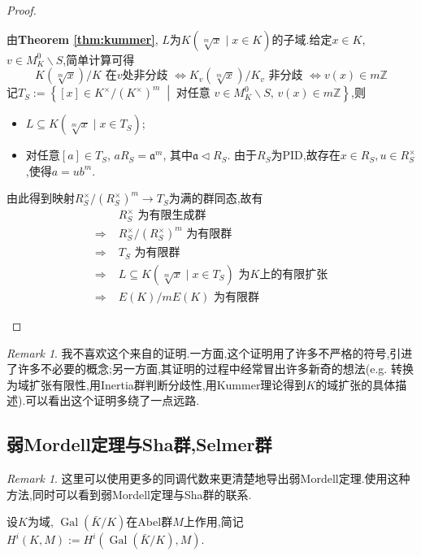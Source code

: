 \documentclass[12pt,A4paper,oneside,reqno]{amsart}
\numberwithin{equation}{section}
\theoremstyle{definition}
\theoremstyle{plain}
\theoremstyle{plain}
\numberwithin{equation}{section}
\theoremstyle{remark}
\newtheorem{remark}[theorem]{Remark}
\newcommand{\Gal}{\operatorname{Gal}}
\begin{document}
\begin{proof}
\begin{enumerate}[1.]
		由\textbf{Theorem \ref{thm:kummer}}, $L$为$K(\sqrt[m]{x} \mid x \in K)$的子域.给定$x \in K$, $v \in M_K^{0} \smallsetminus S$,简单计算可得
		$$K(\sqrt[m]{x})/K \text{ 在$v$处非分歧 } \Longleftrightarrow K_v(\sqrt[m]{x})/K_v \text{ 非分歧 } \Longleftrightarrow v(x) \in m\mathbb{Z}$$
		记$T_S:=\left\{[x] \in K^{\times}/(K^{\times})^m \;\middle|\;\text{对任意 }v \in M_K^{0} \smallsetminus S,\, v(x) \in m\mathbb{Z} \right\}$,则
		\begin{itemize}
			\item $L \subseteq K(\sqrt[m]{x} \mid x \in T_S)$;
			\item 对任意$[a] \in T_S$, $aR_S=\mathfrak{a}^m$, 其中$\mathfrak{a} \vartriangleleft R_S$. 由于$R_S$为PID,故存在$x \in R_S, u \in R_S^{\times}$,使得$a=ub^m$.
		\end{itemize}
	由此得到映射$R_S^{\times}/(R_S^{\times})^m\longrightarrow T_S$为满的群同态,故有
	\begin{equation*}
	\begin{aligned}
		&R_S^{\times}\text{ 为有限生成群}\\
		\Longrightarrow\;&R_S^{\times}/(R_S^{\times})^m \text{ 为有限群}\\
		\Longrightarrow\;&T_S \text{ 为有限群}\\
		\Longrightarrow\;&L \subseteq K(\sqrt[m]{x} \mid x \in T_S) \text{ 为$K$上的有限扩张}\\
		\Longrightarrow\;&E(K)/mE(K)\text{ 为有限群}
	\end{aligned}
	\end{equation*}
	\end{enumerate}
\end{proof}
\begin{remark}
	我不喜欢这个来自\cite{tate1974the}的证明.一方面,这个证明用了许多不严格的符号,引进了许多不必要的概念;另一方面,其证明的过程中经常冒出许多新奇的想法(e.g. 转换为域扩张有限性,用Inertia群判断分歧性,用Kummer理论得到$K$的域扩张的具体描述).可以看出这个证明多绕了一点远路.
\end{remark}
\subsection{弱Mordell定理与Sha群,Selmer群}\label{subse:Step1}

\begin{remark}
	这里可以使用更多的同调代数来更清楚地导出弱Mordell定理.使用这种方法,同时可以看到弱Mordell定理与Sha群的联系.
\end{remark}
	设$K$为域, $\Gal(\bar{K}/K)$在Abel群$M$上作用,简记$H^i(K,M):=H^i(\Gal(\bar{K}/K),M)$.
	
\end{document}

